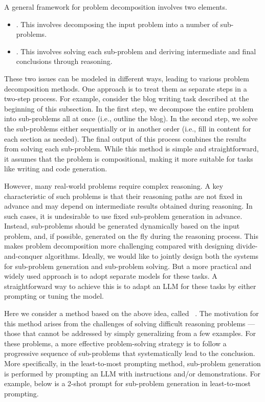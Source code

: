 A general framework for problem decomposition involves two elements.

\begin{itemize}
\item \vspace{0.5em} . This involves decomposing the input problem into a number of sub-problems.
\item \vspace{0.3em} . This involves solving each sub-problem and deriving intermediate and final conclusions through reasoning.
\end{itemize}
\vspace{0.5em}

These two issues can be modeled in different ways, leading to various problem decomposition methods. One approach is to treat them as separate steps in a two-step process. For example, consider the blog writing task described at the beginning of this subsection. In the first step, we decompose the entire problem into sub-problems all at once (i.e., outline the blog). In the second step, we solve the sub-problems either sequentially or in another order (i.e., fill in content for each section as needed). The final output of this process combines the results from solving each sub-problem. While this method is simple and straightforward, it assumes that the problem is compositional, making it more suitable for tasks like writing and code generation.

However, many real-world problems require complex reasoning. A key characteristic of such problems is that their reasoning paths are not fixed in advance and may depend on intermediate results obtained during reasoning. In such cases, it is undesirable to use fixed sub-problem generation in advance. Instead, sub-problems should be generated dynamically based on the input problem, and, if possible, generated on the fly during the reasoning process. This makes problem decomposition more challenging compared with designing divide-and-conquer algorithms. Ideally, we would like to jointly design both the systems for sub-problem generation and sub-problem solving. But a more practical and widely used approach is to adopt separate models for these tasks. A straightforward way to achieve this is to adapt an LLM for these tasks by either prompting or tuning the model.

Here we consider a method based on the above idea, called ~\cite{zhou-etal:least}. The motivation for this method arises from the challenges of solving difficult reasoning problems --- those that cannot be addressed by simply generalizing from a few examples. For these problems, a more effective problem-solving strategy is to follow a progressive sequence of sub-problems that systematically lead to the conclusion. More specifically, in the least-to-most prompting method, sub-problem generation is performed by prompting an LLM with instructions and/or demonstrations. For example, below is a 2-shot prompt for sub-problem generation in least-to-most prompting.

